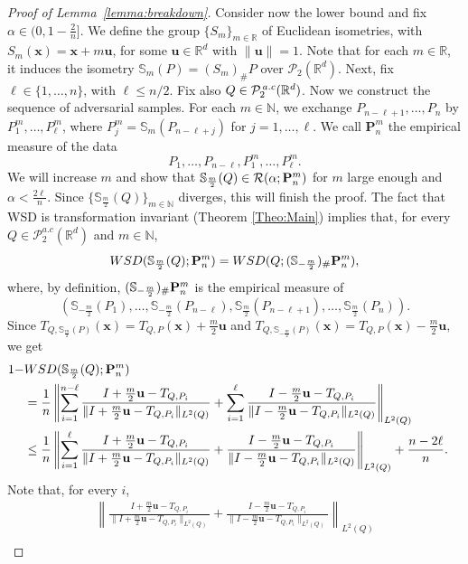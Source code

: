 \documentclass{imsart}
\numberwithin{equation}{section}
\def\N{\mathbb{N}}
\def\R{\mathbb{R}}
\def\P{\mathbb{P}}
\def\x{\mathbf{x}}
\def\u{\mathbf{u}}
\def\P{\mathbb P}
\def\N{\mathbb N}
\def\x{\mathbf x}
\def\P{\mathcal{P}}
\def\Ptac{\P^{\rm {\,}a.c}_2}
\begin{document}
\begin{proof}[Proof of Lemma~\ref{lemma:breakdown}]
	
	Consider now the lower bound and fix $\alpha\in (0,1 - \frac{2}{n} ]$.
	We define the group $\{S_{m}\}_{m\in \R}$ of Euclidean isometries, with $S_{m}(\x)=\x+m \u$, for some $\u\in \R^d$ with $\|\u\|=1$. Note that for each $m\in \mathbb{R}$, it induces the isometry $\mathbb{S}_{m}(P)=(S_{m})_\# P $ over $\mathcal{P}_2(\R^d)$. Next, fix $\ell\in \{1, \dots, n\}$, with $\ell \le n/2$.
	Fix also $Q\in \Ptac(\R^d)$. Now we construct the sequence of adversarial samples. For each $m\in \N$, we exchange  $P_{n-\ell+1}, \dots, P_n$ by $P^{m}_{1}, \dots, P^{m}_\ell$, where $P^m_j= \mathbb{S}_{m}(P_{n-\ell+j})$ for $j=1, \dots, \ell$. We call $\mathbf{P}^{m}_n$ the empirical measure of the data $$ P_1, \dots, P_{n-\ell},  P^{m}_{1}, \dots, P^{m}_\ell.$$
	We will increase $ m $ and show that $ \mathbb{S}_{\frac{m}{2}}(Q) \in \mathcal{R}(\alpha;{\bf P}_n^m)$ for $m$ large enough and $\alpha <   \frac{ 2\ell}{n} $. Since $\{\mathbb{S}_{\frac{m}{2}}(Q)\}_{m\in \N}$ diverges, this will finish the proof. The fact that WSD is transformation invariant (Theorem \ref{Theo:Main}) implies that, for every $Q\in \mathcal{P}_2^{a.c}(\R^d)$ and $m\in \N$, 
	$$  \rm WSD(\mathbb{S}_{\frac{m}{2}}(Q); {\bf P}_n^m) =   \rm WSD(Q; (\mathbb{S}_{-\frac{m}{2}})_\# {\bf P}_n^m),  $$
	where, by definition,  $(\mathbb{S}_{-\frac{m}{2}})_\# {\bf P}_n^m$ is the empirical measure of 
	$$ (\mathbb{S}_{-\frac{m}{2}}(P_1), \dots, \mathbb{S}_{-\frac{m}{2}}(P_{n-\ell}),  \mathbb{S}_{\frac{m}{2}}(P_{n - \ell +1}), \dots, \mathbb{S}_{\frac{m}{2}}(P_n)).$$
	Since 
	$ T_{Q, \mathbb{S}_{\frac{m}{2}}(P) } (\x)  =  T_{Q,P } (\x)+ \frac{m}{2}\u $ 
	and 
	$ T_{Q, \mathbb{S}_{-\frac{m}{2}}(P) } (\x)  =  T_{Q,P } (\x)-\frac{m}{2}\u, $
	we get  
	\begin{align*}
		1- & \rm WSD(\mathbb{S}_{\frac{m}{2}}(Q); {\bf P}_n^m)&\\
		& =  \frac{1}{n}\left\|\sum_{i=1}^{n-\ell}  \frac{I+\frac{m}{2} \u -T_{Q, P_i }  }{\| I+\frac{m}{2} \u -T_{Q, P_i } \|_{L^2(Q)} }+ \sum_{i=1}^\ell  \frac{I-\frac{m}{2} \u -T_{Q, P_i } }{\| I-\frac{m}{2} \u -T_{Q, P_i } \|_{L^2(Q)}}\right\|_{L^2(Q)}\\
		& \leq \frac{1}{n}\left\|\sum_{i=1}^\ell  \frac{I+\frac{m}{2} \u -T_{Q, P_i }  }{\| I+\frac{m}{2} \u -T_{Q, P_i } \|_{L^2(Q)} }+ \frac{I-\frac{m}{2} \u -T_{Q, P_i } }{\| I-\frac{m}{2} \u -T_{Q, P_i } \|_{L^2(Q)}}\right\|_{L^2(Q)}+ \frac{n-2\ell}{n}.
	\end{align*}
	Note that, for every $i$, 
	\begin{multline*}
		\left\|  \frac{I+\frac{m}{2} \u -T_{Q, P_i }  }{\| I+\frac{m}{2} \u -T_{Q, P_i } \|_{L^2(Q)} }+ \frac{I-\frac{m}{2} \u -T_{Q, P_i } }{\| I-\frac{m}{2} \u -T_{Q, P_i } \|_{L^2(Q)}}\right\|_{L^2(Q)} \\

\end{multline*}
\end{proof}
\end{document}
